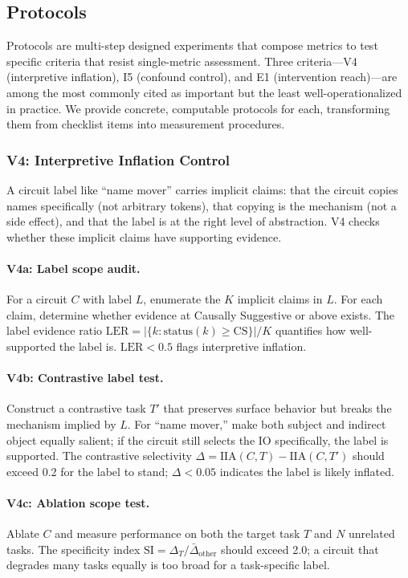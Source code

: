 \documentclass{article}
\begin{document}
\subsection{Protocols}
\label{sec:methodology-protocols}

Protocols are multi-step designed experiments that compose metrics to test specific criteria that resist single-metric assessment. Three criteria---V4 (interpretive inflation), I5 (confound control), and E1 (intervention reach)---are among the most commonly cited as important but the least well-operationalized in practice. We provide concrete, computable protocols for each, transforming them from checklist items into measurement procedures.

\subsubsection{V4: Interpretive Inflation Control}

A circuit label like ``name mover'' carries implicit claims: that the circuit copies names specifically (not arbitrary tokens), that copying is the mechanism (not a side effect), and that the label is at the right level of abstraction. V4 checks whether these implicit claims have supporting evidence.

\paragraph{V4a: Label scope audit.} For a circuit $C$ with label $L$, enumerate the $K$ implicit claims in $L$. For each claim, determine whether evidence at Causally Suggestive or above exists. The label evidence ratio $\text{LER} = |\{k : \text{status}(k) \geq \text{CS}\}| / K$ quantifies how well-supported the label is. $\text{LER} < 0.5$ flags interpretive inflation.

\paragraph{V4b: Contrastive label test.} Construct a contrastive task $T'$ that preserves surface behavior but breaks the mechanism implied by $L$. For ``name mover,'' make both subject and indirect object equally salient; if the circuit still selects the IO specifically, the label is supported. The contrastive selectivity $\Delta = \text{IIA}(C, T) - \text{IIA}(C, T')$ should exceed 0.2 for the label to stand; $\Delta < 0.05$ indicates the label is likely inflated.

\paragraph{V4c: Ablation scope test.} Ablate $C$ and measure performance on both the target task $T$ and $N$ unrelated tasks. The specificity index $\text{SI} = \Delta_T / \bar{\Delta}_{\text{other}}$ should exceed 2.0; a circuit that degrades many tasks equally is too broad for a task-specific label.
\end{document}
